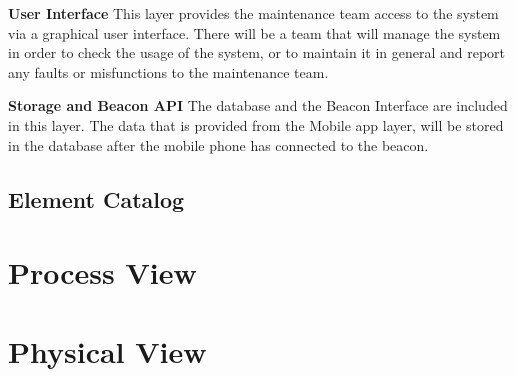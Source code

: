\textbf{User Interface} This layer provides the maintenance team access to the system via a graphical user interface. There will be a team that will manage the system in order to check the usage of the system, or to maintain it in general and report any faults or misfunctions to the maintenance team.

\textbf{Storage and Beacon API} The database and the Beacon Interface are included in this layer. The data that is provided from the Mobile app layer, will be stored in the database after the mobile phone has connected to the beacon.


\subsection{Element Catalog}


\section{Process View}
\section{Physical View}